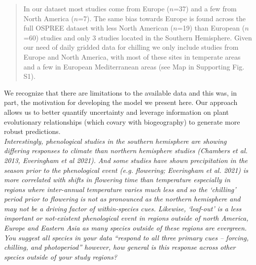 \documentclass[11pt]{article}
\begin{document}
\begin{quote} %
In our dataset most studies come from Europe ($n$=37) and a few from North America ($n$=7). The same bias towards Europe is found across the full OSPREE dataset with less North American ($n$=19) than European ($n$=60) studies and only 3 studies located in the Southern Hemisphere. Given our need of daily gridded data for chilling we only include studies from Europe and North America, with most of these sites in temperate areas and a few in European Mediterranean areas (see Map in Supporting Fig. S1).
\end{quote}

We recognize that there are limitations to the available data and this was, in part, the motivation for developing the model we present here. Our approach allows us to better quantify uncertainty and leverage information on plant evolutionary relationships (which covary with biogeography) to generate more robust predictions.\\ %

\emph{Interestingly, phenological studies in the southern hemisphere are showing differing responses to climate than northern hemisphere studies (Chambers et al. 2013, Everingham et al 2021). And some studies have shown precipitation in the season prior to the phenological event (e.g. flowering; Everingham et al. 2021) is more correlated with shifts in flowering time than temperature especially in regions where inter-annual temperature varies much less and so the ‘chilling’ period prior to flowering is not as pronounced as the northern hemisphere and may not be a driving factor of within-species cues. Likewise, ‘leaf-out’ is a less important or not-existent phenological event in regions outside of north America, Europe and Eastern Asia as many species outside of these regions are evergreen. You suggest all species in your data “respond to all three primary cues – forcing, chilling, and photoperiod” however, how general is this response across other species outside of your study regions?}\\

\end{document}
